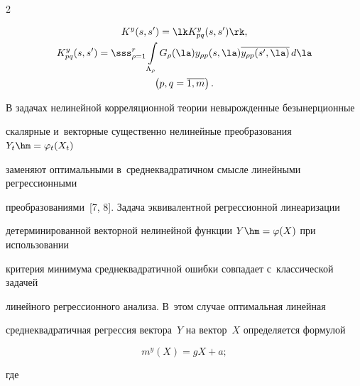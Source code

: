 \begin{multicols}{2}
\noindent

    \begin{multline*}



     K^y (s,s') =\lk K_{pq}^y (s,s')\rk,\\

     K_{pq}^y (s,s') = \displaystyle \sss_{\rho=1}^r \int\limits_{\Lambda_\rho} G_\rho (\la) 

y_{\rho p}(s,\la) \overline{y_{\rho p}(s',\la)}\,d\la\\

\left(p,q=\overline{1,m}\right).




      \end{multline*}



В задачах нелинейной корреляционной теории невырожденные безынерционные 

скалярные и~векторные существенно нелинейные преобразования $Y_t \hm=\varphi_t(X_t)$ 

заменяют оптимальными в~среднеквадратичном смысле линейными регрессионными 

преобразованиями~[7, 8]. Задача эквивалентной регрессионной линеаризации 

детерминированной векторной нелинейной функции $Y\hm=\varphi (X)$ при использовании 

критерия минимума среднеквадратичной ошибки совпадает с~классической задачей 

линейного регрессионного анализа. В~этом случае оптимальная линейная 

среднеквадратичная регрессия вектора~$Y$ на вектор~$X$ определяется формулой

        \begin{equation*}

     m^y(X) =gX+a;

     \end{equation*}

     где

     

     \vspace*{-3pt}

     


\end{multicols}
